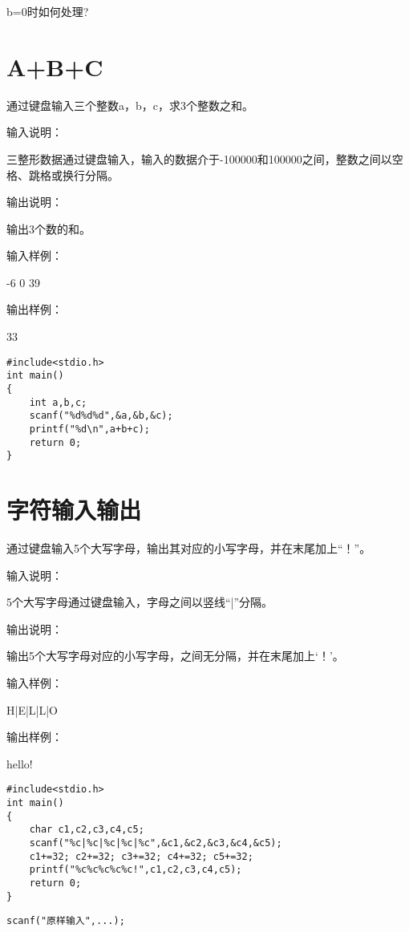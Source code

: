\begin{note}[思考]
	b=0时如何处理?
\end{note}

\section{A+B+C}
通过键盘输入三个整数a，b，c，求3个整数之和。

输入说明：

三整形数据通过键盘输入，输入的数据介于-100000和100000之间，整数之间以空格、跳格或换行分隔。 

输出说明：

输出3个数的和。

输入样例：

-6  0  39

输出样例：

33

\begin{lstlisting}
#include<stdio.h>  
int main()                   
{  
	int a,b,c;
	scanf("%d%d%d",&a,&b,&c);
	printf("%d\n",a+b+c); 
	return 0;           
}           
\end{lstlisting}

\section{字符输入输出}
通过键盘输入5个大写字母，输出其对应的小写字母，并在末尾加上“！”。

输入说明：

5个大写字母通过键盘输入，字母之间以竖线“|”分隔。

输出说明：

输出5个大写字母对应的小写字母，之间无分隔，并在末尾加上‘！’。

输入样例：

H|E|L|L|O

输出样例：

hello!

\begin{lstlisting}
#include<stdio.h>     
int main()                   
{  
	char c1,c2,c3,c4,c5;
	scanf("%c|%c|%c|%c|%c",&c1,&c2,&c3,&c4,&c5);
	c1+=32; c2+=32; c3+=32; c4+=32; c5+=32;
	printf("%c%c%c%c%c!",c1,c2,c3,c4,c5); 
	return 0;           
}           
\end{lstlisting}

\begin{note}[要点]
	\lstinline|scanf("原样输入",...);|
\end{note}

